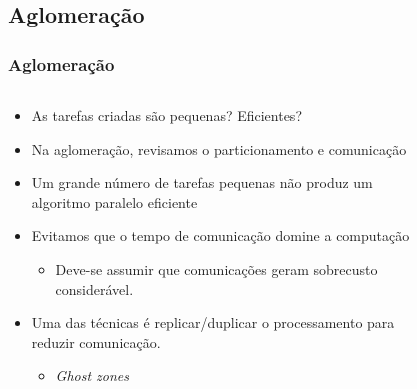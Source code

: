 \documentclass[xcolor={usenames,dvipsnames},12pt,presentation,aspectratio=169]{beamer}
\begin{document}
\subsection{Aglomeração}
\begin{frame}
  \frametitle{Aglomeração}
  \vspace{-2mm}
   \begin{columns}
     \begin{column}{0.6\textwidth}
      \begin{itemize}
        \item As tarefas criadas são pequenas? Eficientes?
        \item Na aglomeração, revisamos o particionamento e comunicação
        \item Um grande número de tarefas pequenas não produz um algoritmo paralelo eficiente
        \item Evitamos que o tempo de comunicação domine a computação
          \begin{itemize}
            \item Deve-se assumir que comunicações geram sobrecusto considerável.
          \end{itemize}
        \item Uma das técnicas é replicar/duplicar o processamento para reduzir comunicação.
          \begin{itemize}
            \item \emph{Ghost zones}
          \end{itemize}
      \end{itemize}
     \end{column}
     \begin{column}{0.4\textwidth}
        \begin{center}
          \begin{figure}

\end{figure}
\end{center}
\end{column}
\end{columns}
\end{frame}
\end{document}
